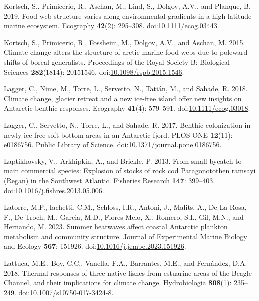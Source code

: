 \documentclass[
]{article}
\newlength{\cslhangindent}
\newenvironment{CSLReferences}[2] %
 {\begin{list}{}{%
  \setlength{\itemindent}{0pt}
  \setlength{\leftmargin}{0pt}
  \setlength{\parsep}{0pt}
  \ifodd #1
   \setlength{\leftmargin}{\cslhangindent}
   \setlength{\itemindent}{-1\cslhangindent}
  \fi
  \setlength{\itemsep}{#2\baselineskip}}}
 {\end{list}}
\begin{document}
\begin{CSLReferences}{1}{0}
Kortsch, S., Primicerio, R., Aschan, M., Lind, S., Dolgov, A.V., and
Planque, B. 2019. Food-web structure varies along environmental
gradients in a high-latitude marine ecosystem. Ecography \textbf{42}(2):
295--308.
doi:\href{https://doi.org/10.1111/ecog.03443}{10.1111/ecog.03443}.

Kortsch, S., Primicerio, R., Fossheim, M., Dolgov, A.V., and Aschan, M.
2015. Climate change alters the structure of arctic marine food webs due
to poleward shifts of boreal generalists. Proceedings of the Royal
Society B: Biological Sciences \textbf{282}(1814): 20151546.
doi:\href{https://doi.org/10.1098/rspb.2015.1546}{10.1098/rspb.2015.1546}.

Lagger, C., Nime, M., Torre, L., Servetto, N., Tatián, M., and Sahade,
R. 2018. Climate change, glacier retreat and a new ice-free island offer
new insights on {Antarctic} benthic responses. Ecography \textbf{41}(4):
579--591.
doi:\href{https://doi.org/10.1111/ecog.03018}{10.1111/ecog.03018}.

Lagger, C., Servetto, N., Torre, L., and Sahade, R. 2017. Benthic
colonization in newly ice-free soft-bottom areas in an {Antarctic}
fjord. PLOS ONE \textbf{12}(11): e0186756. Public Library of Science.
doi:\href{https://doi.org/10.1371/journal.pone.0186756}{10.1371/journal.pone.0186756}.

Laptikhovsky, V., Arkhipkin, A., and Brickle, P. 2013. From small
bycatch to main commercial species: {Explosion} of stocks of rock cod
{Patagonotothen} ramsayi ({Regan}) in the {Southwest Atlantic}.
Fisheries Research \textbf{147}: 399--403.
doi:\href{https://doi.org/10.1016/j.fishres.2013.05.006}{10.1016/j.fishres.2013.05.006}.

Latorre, M.P., Iachetti, C.M., Schloss, I.R., Antoni, J., Malits, A., De
La Rosa, F., De Troch, M., Garcia, M.D., Flores-Melo, X., Romero, S.I.,
Gil, M.N., and Hernando, M. 2023. Summer heatwaves affect coastal
{Antarctic} plankton metabolism and community structure. Journal of
Experimental Marine Biology and Ecology \textbf{567}: 151926.
doi:\href{https://doi.org/10.1016/j.jembe.2023.151926}{10.1016/j.jembe.2023.151926}.

Lattuca, M.E., Boy, C.C., Vanella, F.A., Barrantes, M.E., and Fernández,
D.A. 2018. Thermal responses of three native fishes from estuarine areas
of the {Beagle Channel}, and their implications for climate change.
Hydrobiologia \textbf{808}(1): 235--249.
doi:\href{https://doi.org/10.1007/s10750-017-3424-8}{10.1007/s10750-017-3424-8}.


\end{CSLReferences}
\end{document}
